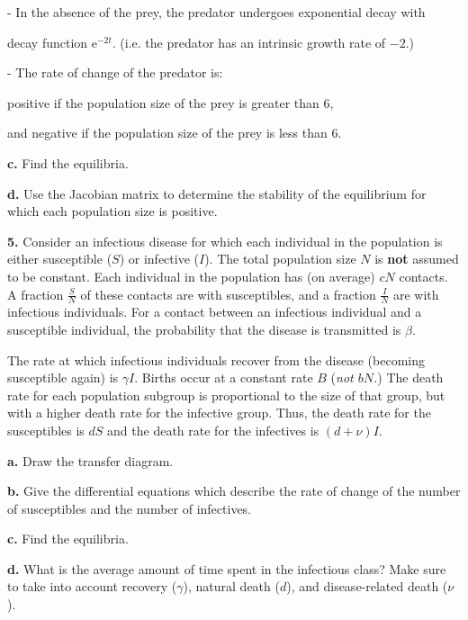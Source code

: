 \documentclass[reqno,12pt]{amsart}
\def\eee{\textrm{e}}
\begin{document}
- In the absence of the prey, the predator undergoes exponential decay
with

\hspace{.2cm} decay function $\eee^{-2t}$.  (i.e. the predator has
an intrinsic growth rate of $-2$.)

- The rate of change of the predator is:

\hspace{.4cm} positive if the population size of the prey is greater than $6$,

\hspace{.4cm} and negative if the population size of the prey is less than $6$.

\noindent
{\bf c.}  Find the equilibria.

\noindent
{\bf d.}  Use the Jacobian matrix to determine the stability of the
equilibrium for which each population size is positive.



\newpage
\vspace{1cm}

\noindent
{\bf 5.}  Consider an infectious disease for which each individual
in the population is either susceptible ($S$) or infective ($I$).
The total population size $N$ is {\bf not} assumed to be constant.
Each individual in the population has (on average) $c N$ contacts.
A fraction $\frac SN$ of these contacts are with susceptibles, and
a fraction $\frac IN$ are with infectious individuals.  For a contact
between an infectious individual and a susceptible individual, the
probability that the disease is transmitted is $\beta$.

The rate at which infectious individuals recover from the disease (becoming
susceptible again) is $\gamma I$.  Births occur at a constant rate $B$
({\it not $bN$.}) The death rate for each population subgroup is
proportional to the size of that group, but with a higher death rate
for the infective group.  Thus, the death rate for the susceptibles is
$d S$ and the death rate for the infectives is $(d+\nu) I$.

\noindent
{\bf a.}  Draw the transfer diagram.

\noindent
{\bf b.}  Give the differential equations which describe the rate of
change of the number of susceptibles and the number of infectives.

\noindent
{\bf c.}  Find the equilibria.

\noindent
{\bf d.}  What is the average amount of time spent in the infectious
class?  Make sure to take into account recovery ($\gamma$), natural
death ($d$), and disease-related death ($\nu$).
\end{document}
